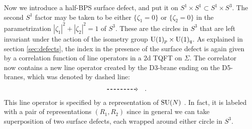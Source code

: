 Now we introduce a half-BPS surface defect, and put it on $S^{1} \times S^{1} \subset S^1 \times S^3$.
The second $S^{1}$ factor may be taken to be either $\{\zeta_{1}=0\}$
or $\{\zeta_{2}=0\}$ in the parametrization $|\zeta_{1}|^{2}+|\zeta_{2}|^{2}=1$
of $S^{3}$. These are the circles in $S^{3}$ that are left invariant
under the action of the isometry group $\mathrm{U}(1)_{p} \times \mathrm{U}(1)_{q}$.
As explained in section \ref{sec:defects}, the index in the presence of the surface
defect is again given by a correlation function of line operators
in a 2d TQFT on $\Sigma$. The correlator now contains a new line
operator created by the D3-brane ending on the D5-branes, which was
denoted by dashed line:
\begin{equation}
    \begin{tikzpicture}[scale=1, baseline=(x.base)]    \node (x) at (0,0) {\vphantom{x}};

        \draw[thick, densely dashed, ->] (0,0) -- (1.6,0);

    \end{tikzpicture}
  \quad .
\end{equation}
This line operator is specified by a representation of $\mathrm{SU}(N)$
\cite{Gukov:2006jk,Gukov:2008sn,Gadde:2013dda}.
In fact, it is labeled with a pair of representations
$(R_{1},R_{2})$ since in general we can take superposition of two
surface defects, each wrapped around either circle in $S^{3}$.

